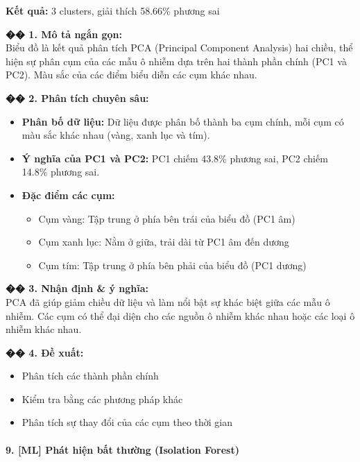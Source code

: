 \documentclass[12pt,a4paper]{article}
\begin{document}
\begin{aibox}
\textbf{Kết quả:} 3 clusters, giải thích 58.66\% phương sai

\textbf{�� 1. Mô tả ngắn gọn:}\\
Biểu đồ là kết quả phân tích PCA (Principal Component Analysis) hai chiều, thể hiện sự phân cụm của các mẫu ô nhiễm dựa trên hai thành phần chính (PC1 và PC2). Màu sắc của các điểm biểu diễn các cụm khác nhau.

\textbf{�� 2. Phân tích chuyên sâu:}
\begin{itemize}
    \item \textbf{Phân bố dữ liệu:} Dữ liệu được phân bố thành ba cụm chính, mỗi cụm có màu sắc khác nhau (vàng, xanh lục và tím).
    \item \textbf{Ý nghĩa của PC1 và PC2:} PC1 chiếm 43.8\% phương sai, PC2 chiếm 14.8\% phương sai.
    \item \textbf{Đặc điểm các cụm:}
    \begin{itemize}
        \item Cụm vàng: Tập trung ở phía bên trái của biểu đồ (PC1 âm)
        \item Cụm xanh lục: Nằm ở giữa, trải dài từ PC1 âm đến dương
        \item Cụm tím: Tập trung ở phía bên phải của biểu đồ (PC1 dương)
    \end{itemize}
\end{itemize}

\textbf{�� 3. Nhận định \& ý nghĩa:}\\
PCA đã giúp giảm chiều dữ liệu và làm nổi bật sự khác biệt giữa các mẫu ô nhiễm. Các cụm có thể đại diện cho các nguồn ô nhiễm khác nhau hoặc các loại ô nhiễm khác nhau.

\textbf{�� 4. Đề xuất:}
\begin{itemize}
    \item Phân tích các thành phần chính
    \item Kiểm tra bằng các phương pháp khác
    \item Phân tích sự thay đổi của các cụm theo thời gian
\end{itemize}
\end{aibox}

\paragraph{9. [ML] Phát hiện bất thường (Isolation Forest)}
\end{document}

